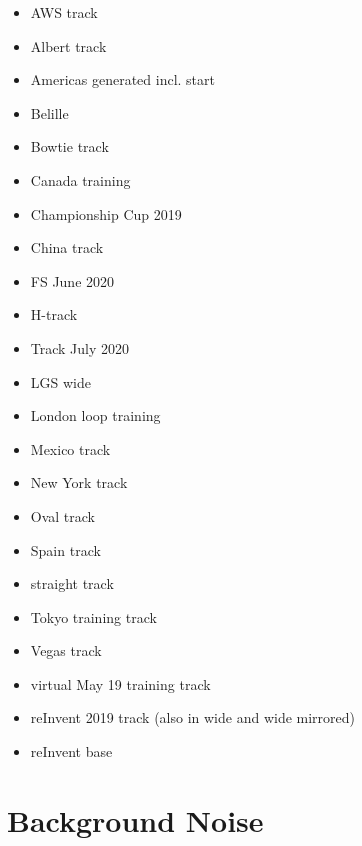 \begin{itemize}
    \item AWS track
    \item Albert track
    \item Americas generated  incl. start
    \item Belille
    \item Bowtie track
    \item Canada training
    \item Championship Cup 2019
    \item China track
    \item FS June 2020
    \item H-track
    \item Track July 2020
    \item LGS wide
    \item London loop training
    \item Mexico track
    \item New York track
    \item Oval track
    \item Spain track
    \item straight track
    \item Tokyo training track
    \item Vegas track
    \item virtual May 19 training track
    \item reInvent 2019 track (also in wide and wide mirrored)
    \item reInvent base
\end{itemize}

\section{Background Noise}\label{sec:BackgroundNoise}